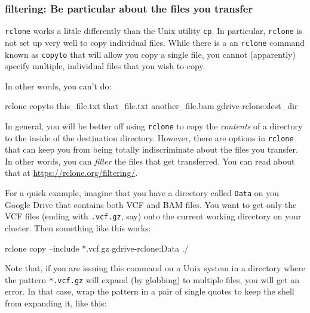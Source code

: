 \documentclass[]{krantz}
\makeatletter
\newenvironment{Shaded}{\begin{snugshade}}{\end{snugshade}}
\newcommand{\ExtensionTok}[1]{#1}
\newcommand{\NormalTok}[1]{#1}
\newenvironment{kframe}{%
\medskip{}
\setlength{\fboxsep}{.8em}
 \def\at@end@of@kframe{}%
 \ifinner\ifhmode%
  \def\at@end@of@kframe{\end{minipage}}%
  \begin{minipage}{\columnwidth}%
 \fi\fi%
 \def\FrameCommand##1{\hskip\@totalleftmargin \hskip-\fboxsep
 \colorbox{shadecolor}{##1}\hskip-\fboxsep
     \hskip-\linewidth \hskip-\@totalleftmargin \hskip\columnwidth}%
 \MakeFramed {\advance\hsize-\width
   \@totalleftmargin\z@ \linewidth\hsize
   \@setminipage}}%
 {\par\unskip\endMakeFramed%
 \at@end@of@kframe}
\renewenvironment{Shaded}{\begin{kframe}}{\end{kframe}}
\makeatother
\begin{document}
\hypertarget{rclone-filter}{%
\subsubsection{filtering: Be particular about the files you transfer}\label{rclone-filter}}

\texttt{rclone} works a little differently than the Unix utility \texttt{cp}. In particular,
\texttt{rclone} is not set up very well to copy individual files. While there is a
an \texttt{rclone} command known as \texttt{copyto} that will allow you copy a single file,
you cannot (apparently) specify multiple, individual files that you wish to copy.

In other words, you can't do:

\begin{Shaded}
\begin{Highlighting}[]
\ExtensionTok{rclone}\NormalTok{ copyto this_file.txt that_file.txt another_file.bam gdrive-rclone:dest_dir}
\end{Highlighting}
\end{Shaded}

In general, you will be better off using \texttt{rclone} to copy the \emph{contents} of a directory
to the inside of the destination directory. However, there are options in \texttt{rclone} that
can keep you from being totally indiscriminate about the files you transfer. In other words,
you can \emph{filter} the files that get transferred. You can read about that at
\url{https://rclone.org/filtering/}.

For a quick example, imagine that you have a directory called \texttt{Data} on you Google Drive
that contains both VCF and BAM files. You want to get only the VCF files (ending with \texttt{.vcf.gz}, say)
onto the current working directory on your cluster. Then something like this works:

\begin{Shaded}
\begin{Highlighting}[]
\ExtensionTok{rclone}\NormalTok{ copy --include *.vcf.gz gdrive-rclone:Data ./}
\end{Highlighting}
\end{Shaded}

Note that, if you are issuing this command on a Unix system in a directory
where the pattern \texttt{*.vcf.gz} will expand (by globbing) to multiple files, you will
get an error. In that case, wrap the pattern in a pair of single quotes to keep
the shell from expanding it, like this:
\end{document}
